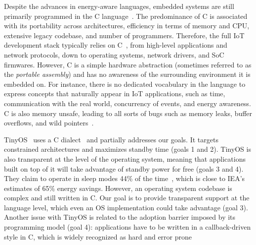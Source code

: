 \documentclass[12pt,english]{amsart}
\begin{document}

Despite the advances in energy-aware languages, embedded systems are still
primarily programmed in the C language~\cite{es.c}.
%
The predominance of C is associated with its portability across architectures,
efficiency in terms of memory and CPU, extensive legacy codebase, and number of
programmers.
%
Therefore, the full IoT development stack typically relies on
C~\cite{wsn.tos,wsn.contiki,wsn.riot}, from high-level applications and
network protocols, down to operating systems, network drivers, and SoC
firmwares.
%
However, C is a simple hardware abstraction (sometimes referred to as the
\emph{portable assembly}) and has no awareness of the surrounding environment
it is embedded on.
%
For instance, there is no dedicated vocabulary in the language to express
concepts that naturally appear in IoT applications, such as time, communication
with the real world, concurrency of events, and energy awareness.
%
C is also memory unsafe, leading to all sorts of bugs such as memory leaks,
buffer overflows, and wild pointers~\cite{c.unsafe}.

TinyOS~\cite{wsn.tos} uses a C dialect~\cite{wsn.nesc} and partially addresses
our goals.
It targets constrained architectures and maximizes standby time (goals 1 and 2).
TinyOS is also transparent at the level of the operating system, meaning that
applications built on top of it will take advantage of standby power for free
(goals 3 and 4).
They claim to operate in sleep modes 44\% of the time~\cite{wsn.tos.2}, which
is close to IEA's estimates of 65\% energy savings.
However, an operating system codebase is complex and still written in C.
Our goal is to provide transparent support at the language level, which even an
OS implementation could take advantage (goal 3).
Another issue with TinyOS is related to the adoption barrier imposed by its
programming model (goal 4): applications have to be written in a
callback-driven style in C, which is widely recognized as hard and error
prone~\cite{sync_async.cooperative,wsn.protothreads,rp.goto,rp.deprecating,frp.rx}
%
\end{document}
